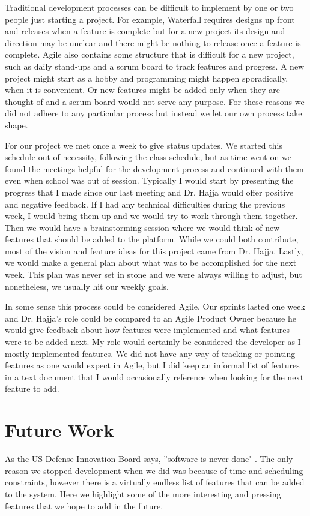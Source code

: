\documentclass{article}
\begin{document}
    Traditional development processes can be difficult to implement by one or two people just starting a project. For example, Waterfall requires designs up front and releases when a feature is complete but for a new project its design and direction may be unclear and there might be nothing to release once a feature is complete. Agile also contains some structure that is difficult for a new project, such as daily stand-ups and a scrum board to track features and progress. A new project might start as a hobby and programming might happen sporadically, when it is convenient. Or new features might be added only when they are thought of and a scrum board would not serve any purpose. For these reasons we did not adhere to any particular process but instead we let our own process take shape.
    \smallskip
    
    For our project we met once a week to give status updates. We started this schedule out of necessity, following the class schedule, but as time went on we found the meetings helpful for the development process and continued with them even when school was out of session. Typically I would start by presenting the progress that I made since our last meeting and Dr. Hajja would offer positive and negative feedback. If I had any technical difficulties during the previous week, I would bring them up and we would try to work through them together. Then we would have a brainstorming session where we would think of new features that should be added to the platform. While we could both contribute, most of the vision and feature ideas for this project came from Dr. Hajja. Lastly, we would make a general plan about what was to be accomplished for the next week. This plan was never set in stone and we were always willing to adjust, but nonetheless, we usually hit our weekly goals.
    \smallskip
    
    In some sense this process could be considered Agile. Our sprints lasted one week and Dr. Hajja's role could be compared to an Agile Product Owner because he would give feedback about how features were implemented and what features were to be added next. My role would certainly be considered the developer as I mostly implemented features. We did not have any way of tracking or pointing features as one would expect in Agile, but I did keep an informal list of features in a text document that I would occasionally reference when looking for the next feature to add.
    
\section{Future Work}\label{future-work}
    As the US Defense Innovation Board says, ''software is never done" \cite{mcquade}. The only reason we stopped development when we did was because of time and scheduling constraints, however there is a virtually endless list of features that can be added to the system. Here we highlight some of the more interesting and pressing features that we hope to add in the future.
    \\\\
    \smallskip
    
\end{document}
